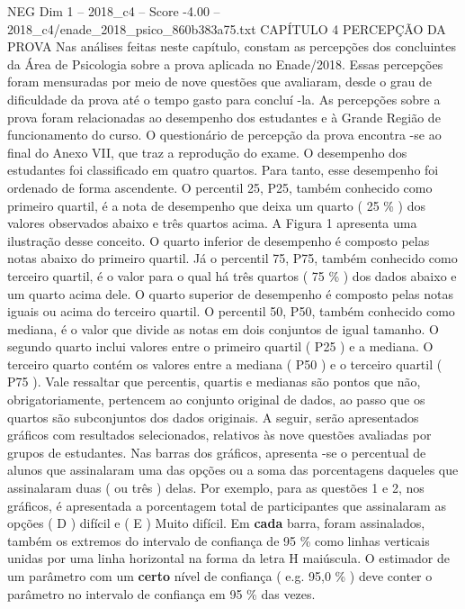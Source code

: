 \begin{textsample}{NEG Dim 1 – 2018\_c4 – Score -4.00 – 2018\_c4/enade\_2018\_psico\_860b383a75.txt}  \label{ex:f1_neg_138}
CAPÍTULO 4 PERCEPÇÃO DA PROVA Nas análises feitas neste capítulo, constam as percepções dos concluintes da Área de Psicologia sobre a prova aplicada no Enade/2018.
Essas percepções foram mensuradas por meio de nove questões que avaliaram, desde o grau de dificuldade da prova até o tempo gasto para concluí -la.
As percepções sobre a prova foram relacionadas ao desempenho dos estudantes e à Grande Região de funcionamento do curso.
O questionário de percepção da prova encontra -se ao final do Anexo VII, que traz a reprodução do exame.
O desempenho dos estudantes foi classificado em quatro quartos.
Para tanto, esse desempenho foi ordenado de forma ascendente.
O percentil 25, P25, também conhecido como primeiro quartil, é a nota de desempenho que deixa um quarto ( 25 \% ) dos valores observados abaixo e três quartos acima.
A Figura 1 apresenta uma ilustração desse conceito.
O quarto inferior de desempenho é composto pelas notas abaixo do primeiro quartil.
Já o percentil 75, P75, também conhecido como terceiro quartil, é o valor para o qual há três quartos ( 75 \% ) dos dados abaixo e um quarto acima dele.
O quarto superior de desempenho é composto pelas notas iguais ou acima do terceiro quartil.
O percentil 50, P50, também conhecido como mediana, é o valor que divide as notas em dois conjuntos de igual tamanho.
O segundo quarto inclui valores entre o primeiro quartil ( P25 ) e a mediana.
O terceiro quarto contém os valores entre a mediana ( P50 ) e o terceiro quartil ( P75 ).
Vale ressaltar que percentis, quartis e medianas são pontos que não, obrigatoriamente, pertencem ao conjunto original de dados, ao passo que os quartos são subconjuntos dos dados originais.
A seguir, serão apresentados gráficos com resultados selecionados, relativos às nove questões avaliadas por grupos de estudantes.
Nas barras dos gráficos, apresenta -se o percentual de alunos que assinalaram uma das opções ou a soma das porcentagens daqueles que assinalaram duas ( ou três ) delas.
Por exemplo, para as questões 1 e 2, nos gráficos, é apresentada a porcentagem total de participantes que assinalaram as opções ( D ) difícil e ( E ) Muito difícil.
Em \textbf{cada} barra, foram assinalados, também os extremos do intervalo de confiança de 95 \% como linhas verticais unidas por uma linha horizontal na forma da letra H maiúscula.
O estimador de um parâmetro com um \textbf{certo} nível de confiança ( e.g. 95,0 \% ) deve conter o parâmetro no intervalo de confiança em 95 \% das vezes.

\end{textsample}
